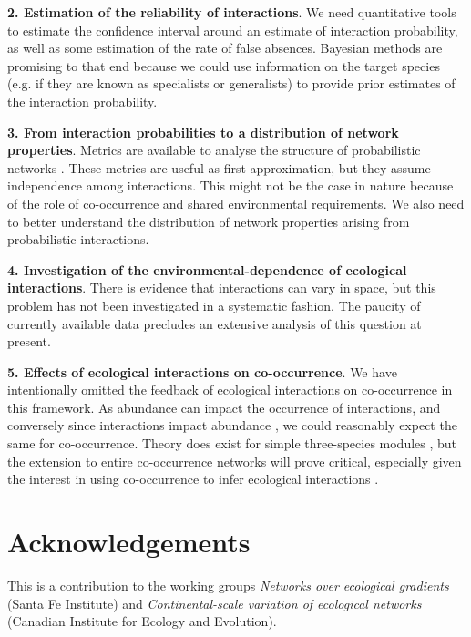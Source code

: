 \documentclass[12pt]{article}
\begin{document}
\textbf{2. Estimation of the reliability of interactions}. We need quantitative tools
to estimate the confidence interval around an estimate of interaction
probability, as well as some estimation of the rate of false absences.
Bayesian methods are promising to that end because we could use information on
the target species (e.g. if they are known as specialists or generalists) to
provide prior estimates of the interaction probability.

\textbf{3. From interaction probabilities to a distribution of network properties}.
Metrics are available to analyse the structure of probabilistic networks
\citep{Poisot2015c}. These metrics are useful as first approximation, but they
assume independence among interactions. This might not be the case in nature
because of the role of co-occurrence and shared environmental requirements. We
also need to better understand the distribution of network properties arising
from probabilistic interactions.

\textbf{4. Investigation of the environmental-dependence of ecological interactions}.
There is evidence that interactions can vary in space, but this problem has
not been investigated in a systematic fashion. The paucity of currently available data
precludes an extensive analysis of this question at present.

\textbf{5. Effects of ecological interactions on co-occurrence}. We have
intentionally omitted the feedback of ecological interactions on co-occurrence
in this framework. As abundance can impact the occurrence of interactions, and
conversely since interactions impact abundance \citep{Canard2014}, we could
reasonably expect the same for co-occurrence. Theory does exist for simple
three-species modules \citep{Cazelles2015}, but the extension to entire co-occurrence
networks will prove critical, especially given the interest in
using co-occurrence to infer ecological interactions \citep{Morales2015,
Morueta-Holme2016}.

\section*{Acknowledgements}
This is a contribution to the working groups \emph{Networks over ecological
gradients} (Santa Fe Institute) and \emph{Continental-scale variation of
ecological networks} (Canadian Institute for Ecology and Evolution).
\newpage


\end{document}
